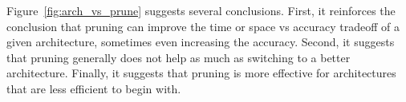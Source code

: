 Figure~\ref{fig:arch_vs_prune} suggests several conclusions. First, it reinforces the conclusion that pruning can improve the time or space vs accuracy tradeoff of a given architecture, sometimes even increasing the accuracy. Second, it suggests that pruning generally does not help as much as switching to a better architecture. Finally, it suggests that pruning is more effective for architectures that are less efficient to begin with. %



